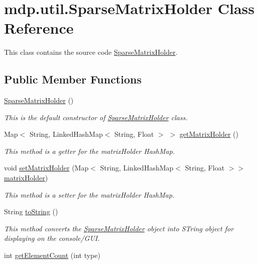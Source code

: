 \hypertarget{classmdp_1_1util_1_1_sparse_matrix_holder}{}\section{mdp.\+util.\+Sparse\+Matrix\+Holder Class Reference}
\label{classmdp_1_1util_1_1_sparse_matrix_holder}


This class contains the source code \hyperlink{classmdp_1_1util_1_1_sparse_matrix_holder}{Sparse\+Matrix\+Holder}.  


\subsection*{Public Member Functions}
\begin{DoxyCompactItemize}
\item 
\hyperlink{classmdp_1_1util_1_1_sparse_matrix_holder_a684bbebe963a3cfcb5cb6b32907c3260}{Sparse\+Matrix\+Holder} ()
\begin{DoxyCompactList}\small\item\em This is the default constructor of \hyperlink{classmdp_1_1util_1_1_sparse_matrix_holder}{Sparse\+Matrix\+Holder} class. \end{DoxyCompactList}\item 
Map$<$ String, Linked\+Hash\+Map$<$ String, Float $>$ $>$ \hyperlink{classmdp_1_1util_1_1_sparse_matrix_holder_a8ac92ce5890ca5a09f44e336a22dd8e8}{get\+Matrix\+Holder} ()
\begin{DoxyCompactList}\small\item\em This method is a getter for the matrix\+Holder Hash\+Map. \end{DoxyCompactList}\item 
void \hyperlink{classmdp_1_1util_1_1_sparse_matrix_holder_aaabfe2c2e01ca5d1af831c409ff6db45}{set\+Matrix\+Holder} (Map$<$ String, Linked\+Hash\+Map$<$ String, Float $>$$>$ \hyperlink{classmdp_1_1util_1_1_sparse_matrix_holder_a3d366c32341591c38a025f75ef755401}{matrix\+Holder})
\begin{DoxyCompactList}\small\item\em This method is a setter for the matrix\+Holder Hash\+Map. \end{DoxyCompactList}\item 
String \hyperlink{classmdp_1_1util_1_1_sparse_matrix_holder_a6f116c63e74de1050e05edf04a97b31f}{to\+String} ()
\begin{DoxyCompactList}\small\item\em This method converts the \hyperlink{classmdp_1_1util_1_1_sparse_matrix_holder}{Sparse\+Matrix\+Holder} object into S\+Tring object for displaying on the console/\+G\+U\+I. \end{DoxyCompactList}\item 
int \hyperlink{classmdp_1_1util_1_1_sparse_matrix_holder_a775e2b85bd7441c7ec315034644cfbdf}{get\+Element\+Count} (int type)
\end{DoxyCompactItemize}
